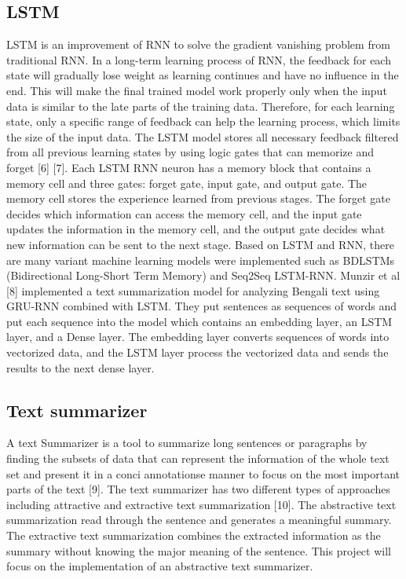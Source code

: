 \documentclass[conference]{IEEEtran}
\begin{document}
\subsection{LSTM}
LSTM is an improvement of RNN to solve the gradient vanishing problem from traditional RNN. In a long-term learning process of RNN, the feedback for each state will gradually lose weight as learning continues and have no influence in the end. This will make the final trained model work properly only when the input data is similar to the late parts of the training data. Therefore, for each learning state, only a specific range of feedback can help the learning process, which limits the size of the input data. The LSTM model stores all necessary feedback filtered from all previous learning states by using logic gates that can memorize and forget [6] [7]. Each LSTM RNN neuron has a memory block that contains a memory cell and three gates: forget gate, input gate, and output gate. The memory cell stores the experience learned from previous stages. The forget gate decides which information can access the memory cell, and the input gate updates the information in the memory cell, and the output gate decides what new information can be sent to the next stage. Based on LSTM and RNN, there are many variant machine learning models were implemented such as BDLSTMs (Bidirectional Long-Short Term Memory) and Seq2Seq LSTM-RNN. Munzir et al [8] implemented a text summarization model for analyzing Bengali text using GRU-RNN combined with LSTM. They put sentences as sequences of words and put each sequence into the model which contains an embedding layer, an LSTM layer, and a Dense layer. The embedding layer converts sequences of words into vectorized data, and the LSTM layer process the vectorized data and sends the results to the next dense layer. 
\subsection{Text summarizer}
A text Summarizer is a tool to summarize long sentences or paragraphs by finding the subsets of data that can represent the information of the whole text set and present it in a conci annotationse manner to focus on the most important parts of the text [9]. The text summarizer has two different types of approaches including attractive and extractive text summarization [10]. The abstractive text summarization read through the sentence and generates a meaningful summary. The extractive text summarization combines the extracted information as the summary without knowing the major meaning of the sentence. This project will focus on the implementation of an abstractive text summarizer. 
\end{document}
